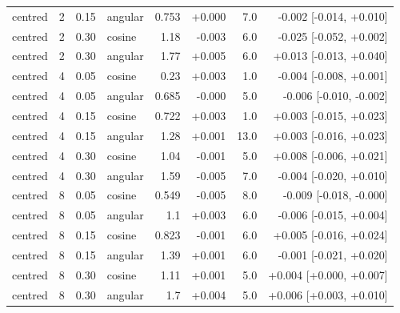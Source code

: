 \begin{tabular}{lrrlrrrr}
centred & 2 & 0.15 & angular & 0.753 & +0.000 & 7.0 & -0.002 [-0.014, +0.010] \\
centred & 2 & 0.30 & cosine & 1.18 & -0.003 & 6.0 & -0.025 [-0.052, +0.002] \\
centred & 2 & 0.30 & angular & 1.77 & +0.005 & 6.0 & +0.013 [-0.013, +0.040] \\
centred & 4 & 0.05 & cosine & 0.23 & +0.003 & 1.0 & -0.004 [-0.008, +0.001] \\
centred & 4 & 0.05 & angular & 0.685 & -0.000 & 5.0 & -0.006 [-0.010, -0.002] \\
centred & 4 & 0.15 & cosine & 0.722 & +0.003 & 1.0 & +0.003 [-0.015, +0.023] \\
centred & 4 & 0.15 & angular & 1.28 & +0.001 & 13.0 & +0.003 [-0.016, +0.023] \\
centred & 4 & 0.30 & cosine & 1.04 & -0.001 & 5.0 & +0.008 [-0.006, +0.021] \\
centred & 4 & 0.30 & angular & 1.59 & -0.005 & 7.0 & -0.004 [-0.020, +0.010] \\
centred & 8 & 0.05 & cosine & 0.549 & -0.005 & 8.0 & -0.009 [-0.018, -0.000] \\
centred & 8 & 0.05 & angular & 1.1 & +0.003 & 6.0 & -0.006 [-0.015, +0.004] \\
centred & 8 & 0.15 & cosine & 0.823 & -0.001 & 6.0 & +0.005 [-0.016, +0.024] \\
centred & 8 & 0.15 & angular & 1.39 & +0.001 & 6.0 & -0.001 [-0.021, +0.020] \\
centred & 8 & 0.30 & cosine & 1.11 & +0.001 & 5.0 & +0.004 [+0.000, +0.007] \\
centred & 8 & 0.30 & angular & 1.7 & +0.004 & 5.0 & +0.006 [+0.003, +0.010] \\
\bottomrule
\end{tabular}

